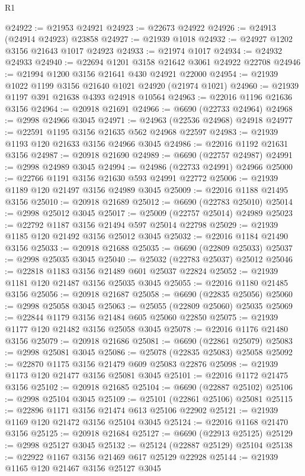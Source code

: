 \begin{lexlean}{R1}
\begin{coremodule}
@24922 := @21953 @24921
@24923 := @22673 @24922
@24926 := @24913 (@24914 @24923) @23858
@24927 := @21939 @1018
@24932 := @24927 @1202 @3156 @21643 @1017 @24923
@24933 := @21974 @1017
@24934 := @24932 @24933
@24940 := @22694 @1201 @3158 @21642 @3061 @24922 @22708
@24946 := @21994 @1200 @3156 @21641 @430 @24921 @22000
@24954 := @21939 @1022 @1199 @3156 @21640 @1021 @24920 (@21974 @1021)
@24960 := @21939 @1197 @391 @21638 @4393 @24918 @10564
@24963 := @22016 @1196 @21636 @3156
@24964 := @20918 @21691
@24966 := @6690 (@22733 @24964)
@24968 := @2998 @24966 @3045
@24971 := @24963 (@22536 @24968) @24918
@24977 := @22591 @1195 @3156 @21635 @562 @24968 @22597
@24983 := @21939 @1193 @120 @21633 @3156 @24966 @3045
@24986 := @22016 @1192 @21631 @3156
@24987 := @20918 @21690
@24989 := @6690 (@22757 @24987)
@24991 := @2998 @24989 @3045
@24994 := @24986 (@22733 @24991) @24966
@25000 := @22766 @1191 @3156 @21630 @593 @24991 @22772
@25006 := @21939 @1189 @120 @21497 @3156 @24989 @3045
@25009 := @22016 @1188 @21495 @3156
@25010 := @20918 @21689
@25012 := @6690 (@22783 @25010)
@25014 := @2998 @25012 @3045
@25017 := @25009 (@22757 @25014) @24989
@25023 := @22792 @1187 @3156 @21494 @597 @25014 @22798
@25029 := @21939 @1185 @120 @21492 @3156 @25012 @3045
@25032 := @22016 @1184 @21490 @3156
@25033 := @20918 @21688
@25035 := @6690 (@22809 @25033)
@25037 := @2998 @25035 @3045
@25040 := @25032 (@22783 @25037) @25012
@25046 := @22818 @1183 @3156 @21489 @601 @25037 @22824
@25052 := @21939 @1181 @120 @21487 @3156 @25035 @3045
@25055 := @22016 @1180 @21485 @3156
@25056 := @20918 @21687
@25058 := @6690 (@22835 @25056)
@25060 := @2998 @25058 @3045
@25063 := @25055 (@22809 @25060) @25035
@25069 := @22844 @1179 @3156 @21484 @605 @25060 @22850
@25075 := @21939 @1177 @120 @21482 @3156 @25058 @3045
@25078 := @22016 @1176 @21480 @3156
@25079 := @20918 @21686
@25081 := @6690 (@22861 @25079)
@25083 := @2998 @25081 @3045
@25086 := @25078 (@22835 @25083) @25058
@25092 := @22870 @1175 @3156 @21479 @609 @25083 @22876
@25098 := @21939 @1173 @120 @21477 @3156 @25081 @3045
@25101 := @22016 @1172 @21475 @3156
@25102 := @20918 @21685
@25104 := @6690 (@22887 @25102)
@25106 := @2998 @25104 @3045
@25109 := @25101 (@22861 @25106) @25081
@25115 := @22896 @1171 @3156 @21474 @613 @25106 @22902
@25121 := @21939 @1169 @120 @21472 @3156 @25104 @3045
@25124 := @22016 @1168 @21470 @3156
@25125 := @20918 @21684
@25127 := @6690 (@22913 @25125)
@25129 := @2998 @25127 @3045
@25132 := @25124 (@22887 @25129) @25104
@25138 := @22922 @1167 @3156 @21469 @617 @25129 @22928
@25144 := @21939 @1165 @120 @21467 @3156 @25127 @3045

\end{coremodule}
\end{lexlean}
